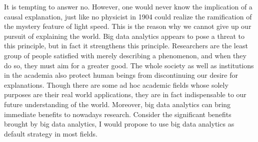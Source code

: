 \documentclass{writing}
\begin{document}
It is tempting to answer no. However, one would never know the
implication of a causal explanation, just like no physicist in 1904
could realize the ramification of the mystery feature of light speed.
This is the reason why we cannot give up our pursuit of explaining the
world. Big data analytics appears to pose a threat to this principle,
but in fact it strengthens this principle. Researchers are the least
group of people satisfied with merely describing a phenomenon, and when
they do so, they must aim for a greater good. The whole society as well
as institutions in the academia also protect human beings from
discontinuing our desire for explanations. Though there are some ad hoc
academic fields whose solely purposes are their real world applications,
they are in fact indispensable to our future understanding of the world.
Moreover, big data analytics can bring immediate benefits to nowadays
research. Consider the significant benefits brought by big data
analytics, I would propose to use big data analytics as default strategy
in most fields.
\end{document}
